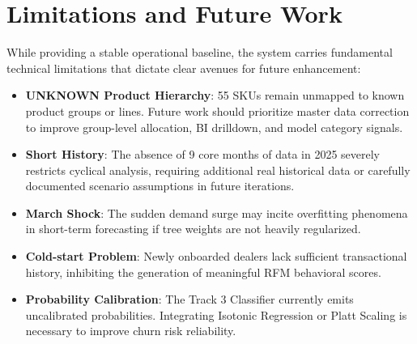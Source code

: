 \section{Limitations and Future Work}
While providing a stable operational baseline, the system carries fundamental technical limitations that dictate clear avenues for future enhancement:
\begin{itemize}
    \item \textbf{UNKNOWN Product Hierarchy}: 55 SKUs remain unmapped to known product groups or lines. Future work should prioritize master data correction to improve group-level allocation, BI drilldown, and model category signals.
    \item \textbf{Short History}: The absence of 9 core months of data in 2025 severely restricts cyclical analysis, requiring additional real historical data or carefully documented scenario assumptions in future iterations.
    \item \textbf{March Shock}: The sudden demand surge may incite overfitting phenomena in short-term forecasting if tree weights are not heavily regularized.
    \item \textbf{Cold-start Problem}: Newly onboarded dealers lack sufficient transactional history, inhibiting the generation of meaningful RFM behavioral scores.
    \item \textbf{Probability Calibration}: The Track 3 Classifier currently emits uncalibrated probabilities. Integrating Isotonic Regression or Platt Scaling is necessary to improve churn risk reliability.
\end{itemize}
\FloatBarrier
